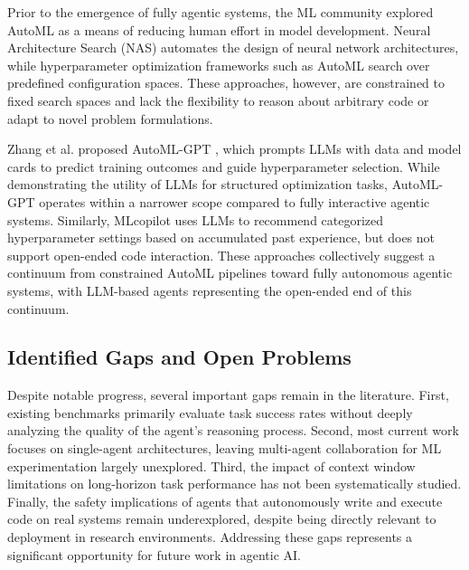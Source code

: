 \documentclass[conference]{IEEEtran}
\begin{document}
Prior to the emergence of fully agentic systems, the ML community explored
AutoML as a means of reducing human effort in model development. Neural
Architecture Search (NAS) \cite{elsken2019nas} automates the design of neural
network architectures, while hyperparameter optimization frameworks such as
AutoML \cite{he2021automl} search over predefined configuration spaces. These
approaches, however, are constrained to fixed search spaces and lack the
flexibility to reason about arbitrary code or adapt to novel problem formulations.

Zhang et al. proposed AutoML-GPT \cite{zhang2023automlgpt}, which prompts LLMs
with data and model cards to predict training outcomes and guide hyperparameter
selection. While demonstrating the utility of LLMs for structured optimization
tasks, AutoML-GPT operates within a narrower scope compared to fully interactive
agentic systems. Similarly, MLcopilot \cite{zhang2023mlcopilot} uses LLMs to
recommend categorized hyperparameter settings based on accumulated past
experience, but does not support open-ended code interaction. These approaches
collectively suggest a continuum from constrained AutoML pipelines toward fully
autonomous agentic systems, with LLM-based agents representing the open-ended
end of this continuum.

\subsection{Identified Gaps and Open Problems}

Despite notable progress, several important gaps remain in the literature.
First, existing benchmarks primarily evaluate task success rates without deeply
analyzing the quality of the agent's reasoning process. Second, most current
work focuses on single-agent architectures, leaving multi-agent collaboration
for ML experimentation largely unexplored. Third, the impact of context window
limitations on long-horizon task performance has not been systematically studied.
Finally, the safety implications of agents that autonomously write and execute
code on real systems remain underexplored, despite being directly relevant to
deployment in research environments. Addressing these gaps represents a
significant opportunity for future work in agentic AI.
\end{document}
